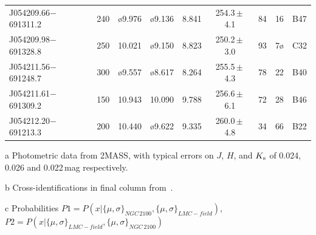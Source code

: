 \begin{table}
\begin{center}
\begin{threeparttable}
\begin{tabular}{lrccccccl }
J054209.66$-$691311.2 & 240 &\o9.976 &\o9.136 & 8.841 & 254.3\,$\pm$\,4.1 & 84 & 16  & B47\\
J054209.98$-$691328.8 & 250 & 10.021 &\o9.150 & 8.823 & 250.2\,$\pm$\,3.0 & 93 & 7\o  & C32\\
J054211.56$-$691248.7 & 300 &\o9.557 &\o8.617 & 8.264 & 255.5\,$\pm$\,4.3 & 78 & 22  & B40\\
J054211.61$-$691309.2 & 150 & 10.943 & 10.090 & 9.788 & 256.6\,$\pm$\,6.1 & 72 & 28  & B46\\
J054212.20$-$691213.3 & 200 & 10.440 &\o9.622 & 9.335 & 260.0\,$\pm$\,4.8 & 34 & 66  & B22\\

\hline
\end{tabular}
\begin{tablenotes}
\item [a] Photometric data from 2MASS, with typical errors on $J$, $H$, and $K_{\rm s}$ of 0.024, 0.026 and 0.022\,mag respectively.
\item [b] Cross-identifications in final column from~\cite{1974A&AS...15..261R}.
\item [c] Probabilities $P1=P(x|\{\mu, \sigma\}_{NGC\,2100}, \{\mu, \sigma\}_{LMC-field})$,\\
                        $P2=P(x|\{\mu, \sigma\}_{LMC-field}, \{\mu, \sigma\}_{NGC\,2100})$
\end{tablenotes}
\end{threeparttable}
\end{center}
\end{table}


